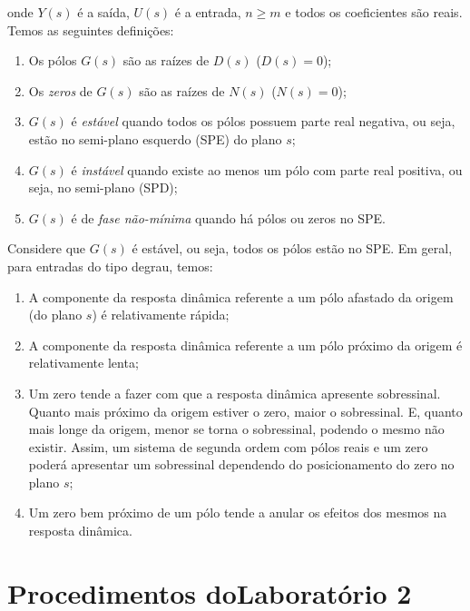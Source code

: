 \documentclass[
]{book}
\providecommand{\tightlist}{%
  \setlength{\itemsep}{0pt}\setlength{\parskip}{0pt}}
\begin{document}
onde \(Y(s)\) é a saída, \(U(s)\) é a entrada, \(n \geq m\) e todos os coeficientes são reais. Temos as seguintes definições:

\begin{enumerate}
\def\labelenumi{\arabic{enumi}.}
\tightlist
\item
  Os pólos \(G(s)\) são as raízes de \(D(s)\) (\(D(s) = 0\));
\item
  Os \emph{zeros} de \(G(s)\) são as raízes de \(N(s)\) (\(N(s) = 0\));
\item
  \(G(s)\) é \emph{estável} quando todos os pólos possuem parte real negativa, ou seja, estão no semi-plano esquerdo (SPE) do plano \(s\);
\item
  \(G(s)\) é \emph{instável} quando existe ao menos um pólo com parte real positiva, ou seja, no semi-plano (SPD);
\item
  \(G(s)\) é de \emph{fase não-mínima} quando há pólos ou zeros no SPE.
\end{enumerate}

Considere que \(G(s)\) é estável, ou seja, todos os pólos estão no SPE. Em geral, para entradas do tipo degrau, temos:

\begin{enumerate}
\def\labelenumi{\arabic{enumi}.}
\tightlist
\item
  A componente da resposta dinâmica referente a um pólo afastado da origem (do plano \(s\)) é relativamente rápida;
\item
  A componente da resposta dinâmica referente a um pólo próximo da origem é relativamente lenta;
\item
  Um zero tende a fazer com que a resposta dinâmica apresente sobressinal. Quanto mais próximo da origem estiver o zero, maior o sobressinal. E, quanto mais longe da origem, menor se torna o sobressinal, podendo o mesmo não existir. Assim, um sistema de segunda ordem com pólos reais e um zero poderá apresentar um sobressinal dependendo do posicionamento do zero no plano \(s\);
\item
  Um zero bem próximo de um pólo tende a anular os efeitos dos mesmos na resposta dinâmica.
\end{enumerate}

\hypertarget{procedimentos-dolaboratuxf3rio-2}{%
\section*{Procedimentos doLaboratório 2}\label{procedimentos-dolaboratuxf3rio-2}}
\end{document}
